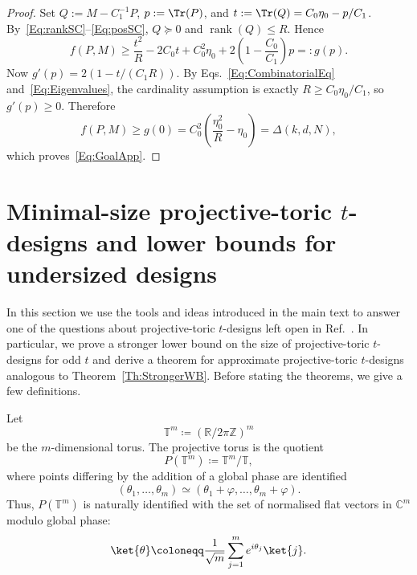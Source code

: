 \documentclass[aps,twocolumn,pra,superscriptaddress,nofootinbib]{revtex4-2}
\begin{document}
\begin{proof}
{Set $Q:=M-C_1^{-1}P$, $p:=\Tr(P)$, and $t:=\Tr(Q)=C_0\eta_0-p/C_1$. By~\eqref{Eq:rankSC}--\eqref{Eq:posSC}, $Q\succeq0$ and $\operatorname{rank}(Q)\le R$. Hence}
\begin{equation}
{f(P,M)\ge \frac{t^2}{R}-2C_0t+C_0^2\eta_0
+2\left(1-\frac{C_0}{C_1}\right)p=:g(p).}
\end{equation}
{Now $g'(p)=2(1-t/(C_1R))$. By Eqs.~\eqref{Eq:CombinatorialEq} and~\eqref{Eq:Eigenvalues}, the cardinality assumption is exactly $R\ge C_0\eta_0/C_1$, so $g'(p)\ge0$. Therefore}
\begin{equation}
{f(P,M)\ge g(0)=C_0^2\left(\frac{\eta_0^2}{R}-\eta_0\right)=\Delta(k,d,N),}
\end{equation}
{which proves~\eqref{Eq:GoalApp}.}
\end{proof}



\section{Minimal-size projective-toric \texorpdfstring{$t$}{t}-designs and lower bounds for undersized designs}\label{app:toric-designs}

In this section we use the tools and ideas introduced in the main text to answer one of the questions about projective-toric $t$-designs left open in
Ref.~\cite{IosueEtAl2024}. In particular, we prove a stronger lower
bound on the size of projective-toric $t$-designs for odd $t$ and derive a theorem for approximate projective-toric $t$-designs analogous to Theorem~\ref{Th:StrongerWB}.
Before stating the theorems, we give a few definitions.

Let
\begin{equation}
    \mathbb{T}^{m}
    \coloneqq
    (\mathbb{R}/2\pi\mathbb{Z})^{m}
\end{equation}
be the $m$-dimensional torus. The projective torus is the quotient
\begin{equation}
    P(\mathbb{T}^{m})
    \coloneqq
    \mathbb{T}^{m}/\mathbb{T},
\end{equation}
where points differing by the addition of a global phase are identified
\begin{equation}
    (\theta_{1},\ldots,\theta_{m})
    \simeq
    (\theta_{1}+\varphi,\ldots,\theta_{m}+\varphi).
\end{equation}
Thus, $P(\mathbb{T}^{m})$ is naturally identified with the set of
normalised flat vectors in $\mathbb{C}^{m}$ modulo global phase:
\begin{equation}
    \ket{\theta}
    \coloneqq
    \frac{1}{\sqrt m}
    \sum_{j=1}^{m}
    e^{i\theta_{j}}\ket{j}.
    \label{eq:flat-toric-vector}
\end{equation}
\end{document}
